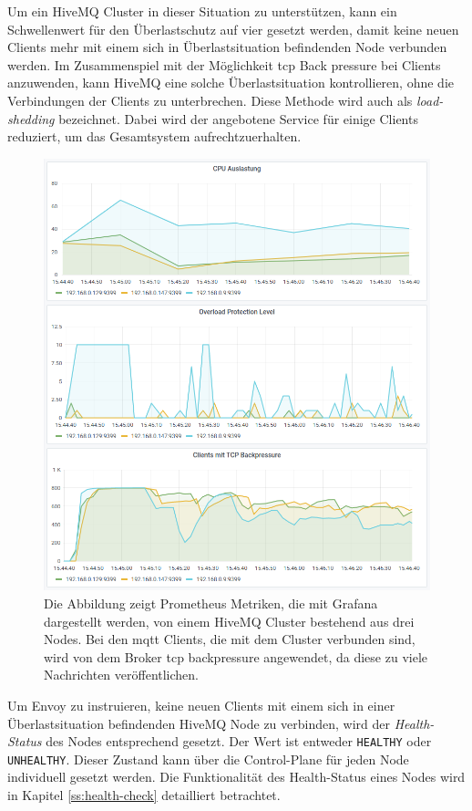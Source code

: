 Um ein HiveMQ Cluster in dieser Situation zu unterstützen, kann ein Schwellenwert für den Überlastschutz auf vier gesetzt werden, damit keine neuen Clients mehr mit einem sich in Überlastsituation befindenden Node verbunden werden.
Im Zusammenspiel mit der Möglichkeit \ac{tcp} Back pressure bei Clients anzuwenden, kann HiveMQ eine solche Überlastsituation kontrollieren, ohne die Verbindungen der Clients zu unterbrechen.
Diese Methode wird auch als \textit{load-shedding} bezeichnet. Dabei wird der angebotene Service für einige Clients reduziert, um das Gesamtsystem aufrechtzuerhalten.
\\
\begin{figure}
    \centering
    \includegraphics[scale=0.8]{images/overload-protection.png}
    \caption{Die Abbildung zeigt Prometheus Metriken, die mit Grafana dargestellt werden, von einem HiveMQ Cluster bestehend aus drei Nodes. Bei den \ac{mqtt} Clients, die mit dem Cluster verbunden sind, wird von dem Broker \ac{tcp} backpressure angewendet, da diese zu viele Nachrichten veröffentlichen.}
    \label{fig:overload-protection}
\end{figure}
Um Envoy zu instruieren, keine neuen Clients mit einem sich in einer Überlastsituation befindenden HiveMQ Node zu verbinden, wird der \textit{Health-Status} des Nodes entsprechend gesetzt.
Der Wert ist entweder \verb|HEALTHY| oder \verb|UNHEALTHY|.
Dieser Zustand kann über die Control-Plane für jeden Node individuell gesetzt werden.
\cite{HealthCheckEnvoy}
Die Funktionalität des Health-Status eines Nodes wird in Kapitel \ref{ss:health-check} detailliert betrachtet.
\newpage


